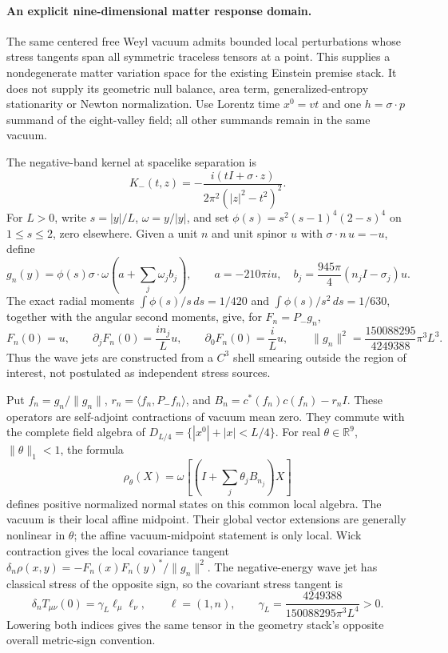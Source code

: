 \paragraph{An explicit nine-dimensional matter response domain.}
The same centered free Weyl vacuum admits bounded local perturbations
whose stress tangents span all symmetric traceless tensors at a point.
This supplies a nondegenerate matter variation space for the existing
Einstein premise stack. It does not supply its geometric null balance,
area term, generalized-entropy stationarity or Newton normalization.
Use Lorentz time $x^0=vt$ and one $h=\sigma\cdot p$ summand of the
eight-valley field; all other summands remain in the same vacuum.

The negative-band kernel at spacelike separation is
\[
 K_-(t,z)=-\frac{i(tI+\sigma\cdot z)}
                   {2\pi^2(|z|^2-t^2)^2}.
\]
For $L>0$, write $s=|y|/L$, $\omega=y/|y|$, and set
$\phi(s)=s^2(s-1)^4(2-s)^4$ on $1\leq s\leq2$, zero elsewhere.
Given a unit $n$ and unit spinor $u$ with $\sigma\cdot n\,u=-u$, define
\[
 g_n(y)=\phi(s)\sigma\cdot\omega
          \left(a+\sum_j\omega_j b_j\right),\qquad
 a=-210\pi i u,\quad b_j=\frac{945\pi}{4}(n_jI-\sigma_j)u.
\]
The exact radial moments $\int\phi(s)/s\,ds=1/420$ and
$\int\phi(s)/s^2\,ds=1/630$, together with the angular second moments,
give, for $F_n=P_-g_n$,
\[
 F_n(0)=u,\qquad \partial_jF_n(0)=\frac{in_j}{L}u,
 \qquad \partial_0F_n(0)=\frac{i}{L}u,
 \qquad \|g_n\|^2=\frac{150088295}{4249388}\pi^3L^3.
\]
Thus the wave jets are constructed from a $C^3$ shell smearing outside
the region of interest, not postulated as independent stress sources.

Put $f_n=g_n/\|g_n\|$, $r_n=\langle f_n,P_-f_n\rangle$, and
$B_n=c^*(f_n)c(f_n)-r_nI$. These operators are self-adjoint contractions
of vacuum mean zero. They commute with the complete field algebra of
$D_{L/4}=\{|x^0|+|x|<L/4\}$. For real $\theta\in\mathbb R^9$,
$\|\theta\|_1<1$, the formula
\[
 \rho_\theta(X)=\omega\left[
       \left(I+\sum_j\theta_j B_{n_j}\right)X\right]
\]
defines positive normalized normal states on this common local algebra.
The vacuum is their local affine midpoint. Their global vector extensions
are generally nonlinear in $\theta$; the affine vacuum-midpoint statement
is only local. Wick contraction gives the local covariance tangent
$\delta_n\rho(x,y)=-F_n(x)F_n(y)^*/\|g_n\|^2$.
The negative-energy wave jet has classical stress of the opposite sign,
so the covariant stress tangent is
\[
 \delta_n T_{\mu\nu}(0)=\gamma_L\ell_\mu\ell_\nu,
 \qquad \ell=(1,n),\qquad
 \gamma_L=\frac{4249388}{150088295\pi^3L^4}>0.
\]
Lowering both indices gives the same tensor in the geometry stack's
opposite overall metric-sign convention.

